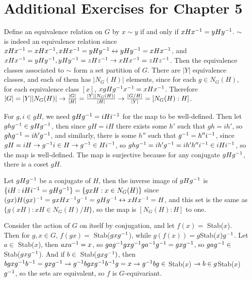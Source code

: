 \documentclass[11pt, oneside]{article}   	%
\begin{document}
\section{Additional Exercises for Chapter 5}
\be
\item \be
\item Define an equivalence relation on $G$ by $x \sim y$ if and only if $xHx^{-1} = yHy^{-1}$. $\sim$ is indeed an equivalence relation since $xHx^{-1} = xHx^{-1}, xHx^{-1} = yHy^{-1} \leftrightarrow yHy^{-1} = xHx^{-1}$, and $xHx^{-1} = yHy^{-1}, yHy^{-1} = zHz^{-1} \rightarrow xHx^{-1} = zHz^{-1}$. Then the equivalence classes associated to $\sim$ form a set partition of $G$. There are $|Y|$ equivalence classes, and each of them has $|N_G(H)|$ elements, since for each $g \in N_G(H)$, for each equivalence class $[x]$, $xgHg^{-1} x^{-1} = xHx^{-1}$. Therefore $|G| = |Y||N_G(H)| \rightarrow \frac{|G|}{|H|} = \frac{|Y||N_G(H)|}{|H|} \rightarrow \frac{|G/H|}{|Y|} = [N_G(H) : H]$.
\item For $g, i \in gH$, we need $gHg^{-1} = iHi^{-1} $ for the map to be well-defined. Then let $ghg^{-1} \in gHg^{-1}$, then since $gH = iH$ there exists some $h'$ such that $gh = ih'$, so $ghg^{-1} = ih'g^{-1}$, and similarly, there is some $h''$ such that $g^{-1} = h''i^{-1}$, since
 $gH = iH \rightarrow g^{-1} i \in H \rightarrow g^{-1} \in Hi^{-1}$, so 
 $ghg^{-1} = ih'g^{-1} = ih'h''i^{-1} \in iHi^{-1}$, so the map is well-defined. The map is surjective because for any conjugate $gHg^{-1}$, there is a coset $gH$.
\item Let $gHg^{-1}$ be a conjugate of $H$, then the inverse image of $gHg^{-1}$ is $\{iH: iHi^{-1} = gHg^{-1}\} = \{gxH: x\in N_G(H)\}$ since $(gx)H(gx)^{-1} = gxHx^{-1} g^{-1} = gHg^{-1} \leftrightarrow xHx^{-1} = H$, and this set is the same as $\{g(xH) : xH \in N_G(H)/H\}$, so the map is $[N_G(H):H]$ to one.
\ee
\item Consider the action of $G$ on itself by conjugation, and let $f(x) = $ Stab($x$). Then for $g, x \in G$, $f(gx) =$ Stab($gxg^{-1}$), while $g(f(x)) = g$Stab($x)g^{-1}$. Let $a \in $ Stab($x$), then $axa^{-1} = x$, so $gag^{-1} gxg^{-1} ga^{-1} g^{-1} = gxg^{-1}$, so $gag^{-1}\in $ Stab($gxg^{-1}$). And if $b \in $ Stab($gxg^{-1})$, then $bgxg^{-1} b^{-1} = gxg^{-1} \rightarrow g^{-1} bgxg^{-1} b^{-1} g = x \rightarrow g^{-1} bg \in $ Stab($x$) $\rightarrow b \in g$Stab($x$)$g^{-1}$, so the sets are equivalent, so $f$ is $G$-equivariant.
\end{document}

